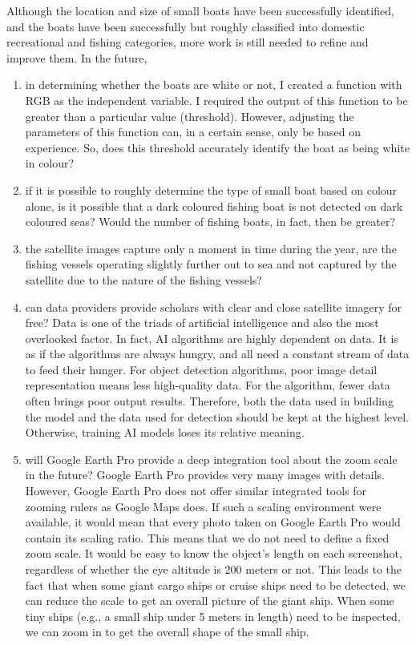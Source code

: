 Although the location and size of small boats have been successfully identified, and the boats have been successfully but roughly classified into domestic recreational and fishing categories, more work is still needed to refine and improve them. In the future,

\begin{enumerate}
    
    \item in determining whether the boats are white or not, I created a function with RGB as the independent variable. I required the output of this function to be greater than a particular value (threshold). However, adjusting the parameters of this function can, in a certain sense, only be based on experience. So, does this threshold accurately identify the boat as being white in colour?
    
    \item if it is possible to roughly determine the type of small boat based on colour alone, is it possible that a dark coloured fishing boat is not detected on dark coloured seas? Would the number of fishing boats, in fact, then be greater?
    
    \item the satellite images capture only a moment in time during the year, are the fishing vessels operating slightly further out to sea and not captured by the satellite due to the nature of the fishing vessels?


    \item can data providers provide scholars with clear and close satellite imagery for free? Data is one of the triads of artificial intelligence and also the most overlooked factor. In fact, AI algorithms are highly dependent on data. It is as if the algorithms are always hungry, and all need a constant stream of data to feed their hunger. For object detection algorithms, poor image detail representation means less high-quality data. For the algorithm, fewer data often brings poor output results. Therefore, both the data used in building the model and the data used for detection should be kept at the highest level. Otherwise, training AI models loses its relative meaning.
    
    \item will Google Earth Pro provide a deep integration tool about the zoom scale in the future? Google Earth Pro provides very many images with details. However, Google Earth Pro does not offer similar integrated tools for zooming rulers as Google Maps does. If such a scaling environment were available, it would mean that every photo taken on Google Earth Pro would contain its scaling ratio. This means that we do not need to define a fixed zoom scale. It would be easy to know the object's length on each screenshot, regardless of whether the eye altitude is 200 meters or not. This leads to the fact that when some giant cargo ships or cruise ships need to be detected, we can reduce the scale to get an overall picture of the giant ship. When some tiny ships (e.g., a small ship under 5 meters in length) need to be inspected, we can zoom in to get the overall shape of the small ship.
    

\end{enumerate}
